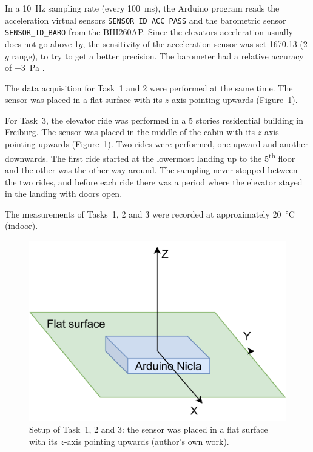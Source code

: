 \documentclass[DIV=14]{scrartcl}
\begin{document}
    In a \SI{10}{\hertz} sampling rate (every \SI{100}{\milli\second}), the Arduino program reads the acceleration
    virtual sensors \texttt{SENSOR\_ID\_ACC\_PASS} and the barometric sensor
    \texttt{SENSOR\_ID\_BARO} from the BHI260AP.
    Since the elevators acceleration usually does not go above 1$g$, the sensitivity of the acceleration sensor was set
    \SI{1670.13}{} (2$g$ range), to try to get a better precision.
    The barometer had a relative accuracy of $\pm$\SI{3}{\pascal} \cite{BHI260}.

    The data acquisition for Task~1 and 2 were performed at the same time.
    The sensor was placed in a flat surface with its $z$-axis pointing upwards (Figure~\ref{fig:setup}).

    For Task~3, the elevator ride was performed in a 5 stories residential building in Freiburg.
    The sensor was placed in the middle of the cabin with its $z$-axis pointing upwards (Figure~\ref{fig:setup}).
    Two rides were performed, one upward and another downwards.
    The first ride started at the lowermost landing up to the 5\textsuperscript{th} floor and the other was the
    other way around.
    The sampling never stopped between the two rides, and before each ride there was a period where the elevator
    stayed in the landing with doors open.

    The measurements of Tasks~1, 2 and 3 were recorded at approximately \SI{20}{\celsius} (indoor).

    \vspace{3em}

    \begin{figure}[h]
        \centering
        \includegraphics[width=.6\textwidth]{figures/Setup1and2}
        \caption{Setup of Task~1, 2 and 3: the sensor was placed in a flat surface with its $z$-axis pointing upwards
            (author's own work).}
        \label{fig:setup}
    \end{figure}
\end{document}

